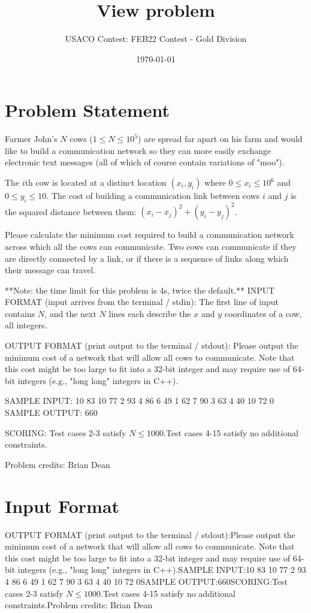 \documentclass[12pt]{article}
\title{View problem}
\author{USACO Contest: FEB22 Contest - Gold Division}
\date{\today}
\begin{document}
\maketitle

\section*{Problem Statement}

Farmer John's $N$ cows ($1 \leq N \leq 10^5$) are spread far apart on his  farm
and would like to build a communication network so they can more easily exchange
electronic text messages (all of which of course contain variations of "moo").

The $i$th cow is located at a distinct location $(x_i,y_i)$ where
$0 \leq x_i \leq 10^6$ and $0 \leq y_i \leq 10$.  The cost of building a
communication link between cows $i$ and $j$ is the squared distance between
them: $(x_i-x_j)^2 + (y_i-y_j)^2$.

Please calculate the minimum cost required to build a communication network
across which all the cows can communicate.  Two cows can communicate if they are
directly connected by a link, or if there is a sequence of links along which
their message can travel.  

**Note: the time limit for this problem is 4s, twice the default.**
INPUT FORMAT (input arrives from the terminal / stdin):
The first line of input contains $N$, and the next $N$ lines each describe the
$x$ and $y$ coordinates of a cow, all integers.

OUTPUT FORMAT (print output to the terminal / stdout):
Please output the minimum cost of a network that will allow all cows to
communicate.  Note that this cost might be too large to fit into a 32-bit
integer and may require use of 64-bit integers (e.g., "long long" integers in
C++).

SAMPLE INPUT:
10
83 10
77 2
93 4
86 6
49 1
62 7
90 3
63 4
40 10
72 0
SAMPLE OUTPUT: 
660

SCORING:
Test cases 2-3 satisfy $N \le 1000$.Test cases 4-15 satisfy no additional constraints.


Problem credits: Brian Dean



\section*{Input Format}
OUTPUT FORMAT (print output to the terminal / stdout):Please output the minimum cost of a network that will allow all cows to
communicate.  Note that this cost might be too large to fit into a 32-bit
integer and may require use of 64-bit integers (e.g., "long long" integers in
C++).SAMPLE INPUT:10
83 10
77 2
93 4
86 6
49 1
62 7
90 3
63 4
40 10
72 0SAMPLE OUTPUT:660SCORING:Test cases 2-3 satisfy $N \le 1000$.Test cases 4-15 satisfy no additional constraints.Problem credits: Brian Dean
\end{document}
